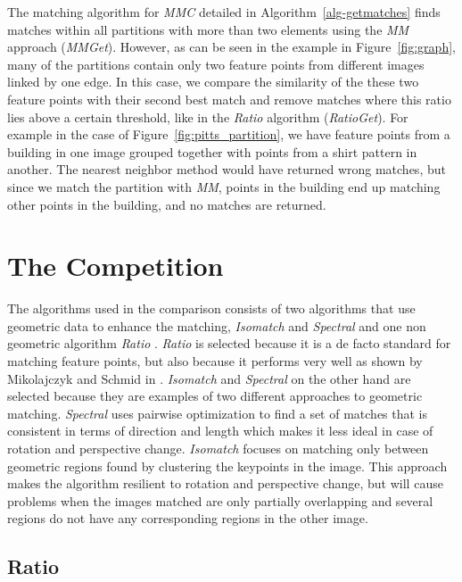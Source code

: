 The matching algorithm for \emph{MMC} detailed in 
Algorithm~\ref{alg-getmatches} finds matches within all partitions with 
more than two elements using the \emph{MM} approach (\emph{MMGet}).  
However, as can be seen in the example in Figure~\ref{fig:graph}, many 
of the partitions contain only two feature points from different images 
linked by one edge. In this case, we compare the similarity of the these 
two feature points with their second best match and remove matches where 
this ratio lies above a certain threshold, like in the \emph{Ratio} 
algorithm (\emph{RatioGet}).  For example in the case of 
Figure~\ref{fig:pitts_partition}, we have feature points from a building 
in one image grouped together with points from a shirt pattern in 
another.  The nearest neighbor method would have returned wrong matches, 
but since we match the partition with \emph{MM}, points in the building 
end up matching other points in the building, and no matches are 
returned.

\section{The Competition}

The algorithms used in the comparison consists of two algorithms that 
use geometric data to enhance the matching, \emph{Isomatch} 
\cite{das2008event} and \emph{Spectral} \cite{leordeanu2005spectral} and 
one non geometric algorithm \emph{Ratio} \cite{lowe2004sift}.  
\emph{Ratio} is selected because it is a de facto standard for matching 
feature points, but also because it performs very well as shown by 
Mikolajczyk and Schmid in \cite{mikolajczyk2005performance}.  
\emph{Isomatch} and \emph{Spectral} on the other hand are selected 
because they are examples of two different approaches to geometric 
matching. \emph{Spectral} uses pairwise optimization to find a set of 
matches that is consistent in terms of direction and length which makes 
it less ideal in case of rotation and perspective change. 
\emph{Isomatch} focuses on matching only between geometric regions found 
by clustering the keypoints in the image.  This approach makes the 
algorithm resilient to rotation and perspective change, but will cause 
problems when the images matched are only partially overlapping and 
several regions do not have any corresponding regions in the other 
image.

\subsection{Ratio}
\label{ss:ratio}

